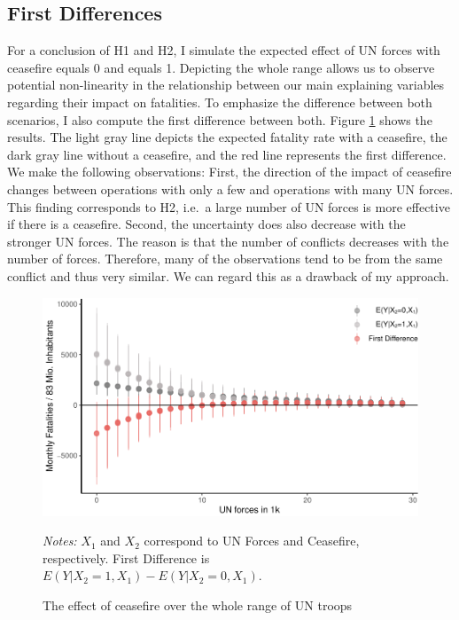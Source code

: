 \documentclass[12pt,english,a4paper,oneside]{article}
\begin{document}
\hypertarget{first-differences}{%
\subsection{First Differences}\label{first-differences}}

For a conclusion of H1 and H2, I simulate the expected effect of UN forces with ceasefire equals 0 and equals 1. Depicting the whole range allows us to observe potential non-linearity in the relationship between our main explaining variables regarding their impact on fatalities. To emphasize the difference between both scenarios, I also compute the first difference between both. Figure \ref{fig:plot-fd} shows the results. The light gray line depicts the expected fatality rate with a ceasefire, the dark gray line without a ceasefire, and the red line represents the first difference. We make the following observations: First, the direction of the impact of ceasefire changes between operations with only a few and operations with many UN forces. This finding corresponds to H2, i.e.~a large number of UN forces is more effective if there is a ceasefire. Second, the uncertainty does also decrease with the stronger UN forces. The reason is that the number of conflicts decreases with the number of forces. Therefore, many of the observations tend to be from the same conflict and thus very similar. We can regard this as a drawback of my approach.

\begin{figure}
\includegraphics[width=\textwidth]{figs/plot-fd-1} \caption[The effect of ceasefire over the whole range of UN troops]{The effect of ceasefire over the whole range of UN troops}\label{fig:plot-fd}
\vspace{0.5cm} \footnotesize{\textit{Notes: }$X_1$ and $X_2$ correspond to UN Forces and Ceasefire, respectively. First Difference is $E(Y|X_2=1,X_1) - E(Y|X_2=0,X_1)$.} \end{figure}
\end{document}
